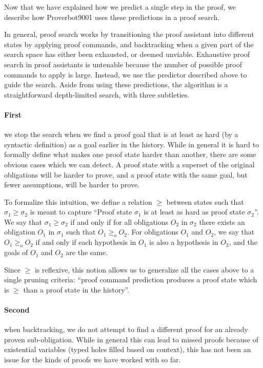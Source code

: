 \documentclass[sigplan,screen]{acmart}
\newcommand{\name}{Proverbot9001\xspace}
\newcommand{\st}{\sigma}
\renewcommand{\>}{\quad}
\begin{document}
Now that we have explained how we predict a single step in the proof, we
describe how \name{} uses these predictions in a proof search.

In general,
proof search works by transitioning the proof assistant into different states by applying proof commands,
and backtracking when a given part of the search space has either been exhausted, or deemed unviable.
Exhaustive proof search in proof assistants is untenable
because the number of possible proof commands to apply is large.
Instead, we use the predictor described above to guide
the search.
Aside from using these predictions, the algorithm is a straightforward depth-limited search, with three subtleties.

\paragraph{First} we stop the search when we find a proof goal
that is at least as hard (by a syntactic definition)
as a goal earlier in the history.
While in general it is hard to formally define
  what makes one proof state harder than another,
  there are some obvious cases which we can detect.
A proof state with a superset of the original obligations will be harder to prove,
and a proof state with the same goal, but fewer assumptions, will be harder to prove.

To formalize this intuition, we define a relation $\ge$ between states
  such that ${\st}_1 \ge {\st}_2$ is meant to capture
  ``Proof state ${\st}_1$ is at least as hard as proof state ${\st}_2$''.
We say that ${\st}_1 \ge {\st}_2$ if and only if for all obligations $O_2$ in ${\st}_2$
  there exists an obligation $O_1$ in ${\st}_1$ such that
  $O_1 {\ge}_o O_2$.
For obligations $O_1$ and $O_2$, we say that
  $O_1 {\ge}_o O_2$ if and only if each hypothesis in $O_1$
  is also a hypothesis in $O_2$,
  and the goals of $O_1$ and $O_2$ are the same.

Since $\ge$ is reflexive,
  this notion allows us to generalize all the cases above
  to a single pruning criteria:
  ``proof command prediction produces a proof state
    which is $\ge$ than a proof state in the history''.

\paragraph{Second} when backtracking, we do not attempt to find a
different proof for an already proven sub-obligation. While in general this can
lead to missed proofs because of existential variables (typed holes filled based on context),
this has not been an issue for the kinds of proofs we have worked with so far.
\end{document}
